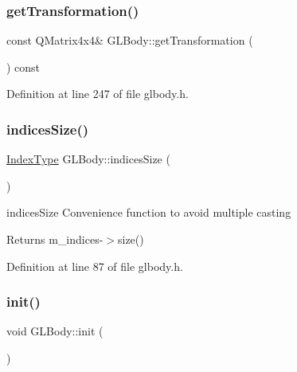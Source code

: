 \subsubsection{\texorpdfstring{getTransformation()}{getTransformation()}}
{\footnotesize\ttfamily const Q\+Matrix4x4\& G\+L\+Body\+::get\+Transformation (\begin{DoxyParamCaption}{ }\end{DoxyParamCaption}) const\hspace{0.3cm}{\ttfamily [inline]}}



Definition at line 247 of file glbody.\+h.

\mbox{\label{class_g_l_body_a10511a36b5bc7012290252f84d40ac74}} 
\subsubsection{\texorpdfstring{indicesSize()}{indicesSize()}}
{\footnotesize\ttfamily \mbox{\hyperlink{gldefines_8h_af3c748960f29c42e5b7f1dc449ab66ff}{Index\+Type}} G\+L\+Body\+::indices\+Size (\begin{DoxyParamCaption}{ }\end{DoxyParamCaption})\hspace{0.3cm}{\ttfamily [inline]}}



indices\+Size Convenience function to avoid multiple casting 

\begin{DoxyReturn}{Returns}
m\+\_\+indices-\/$>$size() 
\end{DoxyReturn}


Definition at line 87 of file glbody.\+h.

\mbox{\label{class_g_l_body_a02b789838bb2c60008ba7878eb6bb28e}} 
\subsubsection{\texorpdfstring{init()}{init()}}
{\footnotesize\ttfamily void G\+L\+Body\+::init (\begin{DoxyParamCaption}{ }\end{DoxyParamCaption})\hspace{0.3cm}{\ttfamily [protected]}}



